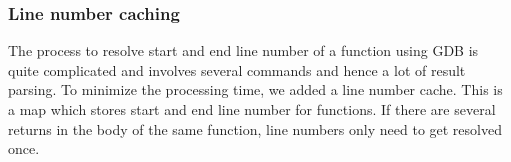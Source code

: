 \subsubsection{Line number caching} The process to resolve start and end line number of a function using GDB is quite complicated and involves several commands and hence a lot of result parsing. To minimize the processing time, we added a line number cache. This is a map which stores start and end line number for functions. If there are several returns in the body of the same function, line numbers only need to get resolved once.
